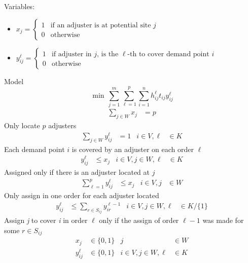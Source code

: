 Variables:
\begin{itemize}
\item $x_j =
  \begin{cases} 
    1 & \mbox{if an adjuster is at potential site } j \\
    0 & \mbox{otherwise}
  \end{cases}$
\item $y_{ij}^{\ell} =
  \begin{cases} 
    1 & \mbox{if adjuster in } j \mbox{, is the }
    \ell\mbox{-th to cover demand point } i \\
    0 & \mbox{otherwise}
  \end{cases}$
\end{itemize}

Model
{\small
  \begin{equation}
    \min \, \sum_{j=1}^{m}{
      \sum_{\ell=1}^{p}{
        \sum_{i=1}^{n}{
          h_{ij}^{\ell}t_{ij}y_{ij}^{\ell}
        }
      }
    }
  \end{equation}
}
\begin{align}
  \label{eq:2}
  \sum_{j \in W}{x_j}
  & = p
\end{align}
Only locate $p$ adjusters
\begin{align}
  \label{eq:3}
  \sum_{j \in W}{y_{ij}^{\ell}}
  & = 1
  & i \in V, \ell
  &\in K
\end{align}
Each demand point $i$ is covered by an adjuster on each order $\ell$
\begin{align}
  \label{eq:4}
  y_{ij}^{\ell}
  & \leq x_j
  & i \in V,j \in W, \ell
  &\in K
\end{align}
Assigned only if there is an adjuster located at $j$
\begin{align}
  \label{eq:5}
  \sum_{\ell = 1}^{p}{
    y_{ij}^{\ell}
  }
  & \leq x_j
  & i \in V, j 
  & \in W
\end{align}
Only assign in one order for each adjuster located 
\begin{align}
  y_{ij}^{\ell} 
  & \leq \sum_{r\in S_{ij}}{y_{ir}^{\ell-1}}
  & i \in V,j \in W, \ell
  & \in K/\{1\}
\end{align}
Assign \textit{j} to cover \textit{i} in order $\ell$
only if
the assign of order $\ell-1$
was made for some $r \in S_{ij}$
\begin{align}
  x_{j}
  & \in \{0,1\}
  & j 
  & \in W \nonumber
  \\
  y_{ij}^{\ell}
  & \in \{0,1\}
  &  i \in V,j \in W,\ell
  &\in K \nonumber
\end{align}

%
